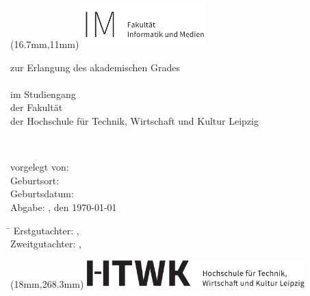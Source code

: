 

\begin{titlepage}
	\noindent
\begin{textblock*}{4.74cm}(16.7mm,11mm)
\includegraphics[width=4.74cm]{Bilder/logos/HTWK-Fakultaetszusatz_IM_schwarz_de-eps-converted-to.pdf}
\end{textblock*}
\begin{center}

\vspace*{0.5cm}

\large
{\textsc{\Large \abschlussarbeit}}

\vspace*{0.5cm}
zur Erlangung des akademischen Grades\\[0.6cm]
\studienganggrad\\[0.6cm]
im Studiengang \studiengang\\
der Fakultät \\
der Hochschule für Technik, Wirtschaft und Kultur Leipzig

{\LARGE \textbf{\titel}}\\
{\LARGE \textbf{\subtitel}}

\end{center}


\vspace*{2cm}
vorgelegt von: \autor \\
Geburtsort: \geburtsort \\
Geburtsdatum: \geburtstag \\
Abgabe: \ort, den \today


\vspace*{1cm}
\large
\begin{tabbing}
\hspace{4cm}\=\kill
Erstgutachter:  \> \erstgutachter, \instituteErstgutachter\\ 
Zweitgutachter: \> \zweitgutachter, \instituteZweitgutachter
\end{tabbing} 

\begin{textblock*}{8.41cm}(18mm,268.3mm)
\includegraphics[width=8.41cm]{Bilder/logos/htwk-logo-eps-converted-to.pdf}
\end{textblock*}

\end{titlepage}

